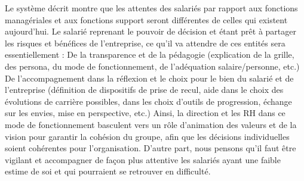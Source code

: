 \documentclass[12pt]{article}
\begin{document}
 Le système décrit montre que les attentes des salariés par rapport aux fonctions managériales et aux fonctions support seront différentes de celles qui existent aujourd’hui. Le salarié reprenant le pouvoir de décision et étant prêt à partager les risques et bénéfices de l’entreprise, ce qu’il va attendre de ces entités sera essentiellement : 
 De la transparence et de la pédagogie (explication de la grille, des persona, du mode de fonctionnement, de l’adéquation salaire/personne, etc.)
 De l’accompagnement dans la réflexion et le choix pour le bien du salarié et de l’entreprise (définition de dispositifs de prise de recul, aide dans le choix des évolutions de carrière possibles, dans les choix d’outils de progression, échange sur les envies, mise en perspective, etc.)
 Ainsi, la direction et les RH dans ce mode de fonctionnement basculent vers un rôle d’animation des valeurs et de la vision pour garantir la cohésion du groupe, afin que les décisions individuelles soient cohérentes pour l’organisation. 
 D’autre part, nous pensons qu’il faut être vigilant et accompagner de façon plus attentive les salariés ayant une faible estime de soi et qui pourraient se retrouver en difficulté.
\end{document}
